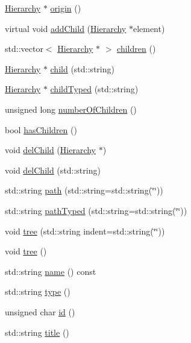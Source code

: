 \begin{DoxyCompactItemize}
\item 
\hyperlink{classHierarchy}{Hierarchy} $\ast$ \hyperlink{classHierarchy_aee461dc930ce3871636ff87f075b1b83}{origin} ()
\item 
virtual void \hyperlink{classHierarchy_ad677774ff38fcb257c04a3a10d471fac}{add\+Child} (\hyperlink{classHierarchy}{Hierarchy} $\ast$element)
\item 
std\+::vector$<$ \hyperlink{classHierarchy}{Hierarchy} $\ast$ $>$ \hyperlink{classHierarchy_aa9a76f69e98e052ee1a6e32cea006288}{children} ()
\item 
\hyperlink{classHierarchy}{Hierarchy} $\ast$ \hyperlink{classHierarchy_a1e207f973c694b538bf90107b4868817}{child} (std\+::string)
\item 
\hyperlink{classHierarchy}{Hierarchy} $\ast$ \hyperlink{classHierarchy_a0c15a5276a3b80b4354d6bd8a01e0708}{child\+Typed} (std\+::string)
\item 
unsigned long \hyperlink{classHierarchy_ab16e84de65fd84e14001a6cf941c8be4}{number\+Of\+Children} ()
\item 
bool \hyperlink{classHierarchy_a255174fe4d316d2a3f430dcb9dab29f1}{has\+Children} ()
\item 
void \hyperlink{classHierarchy_a2b2b359fac003233f65786a616766bde}{del\+Child} (\hyperlink{classHierarchy}{Hierarchy} $\ast$)
\item 
void \hyperlink{classHierarchy_a1928ac7615fe0b5e55cd707f70dc6781}{del\+Child} (std\+::string)
\item 
std\+::string \hyperlink{classHierarchy_aa7990fa7caf132d83e361ce033c6c65a}{path} (std\+::string=std\+::string(\char`\"{}\char`\"{}))
\item 
std\+::string \hyperlink{classHierarchy_a1efd56cd164d328d2002e53a10a19b8c}{path\+Typed} (std\+::string=std\+::string(\char`\"{}\char`\"{}))
\item 
void \hyperlink{classHierarchy_a76e914b9a677a22a82deb74d892bf261}{tree} (std\+::string indent=std\+::string(\char`\"{}\char`\"{}))
\item 
void \hyperlink{classHierarchy_a594c294c5f60c230e106d522ed008212}{tree} ()
\item 
std\+::string \hyperlink{classObject_a300f4c05dd468c7bb8b3c968868443c1}{name} () const
\item 
std\+::string \hyperlink{classObject_a84f99f70f144a83e1582d1d0f84e4e62}{type} ()
\item 
unsigned char \hyperlink{classObject_af99145335cc61ff6e2798ea17db009d2}{id} ()
\item 
std\+::string \hyperlink{classObject_a73a0f1a41828fdd8303dd662446fb6c3}{title} ()

\end{DoxyCompactItemize}
